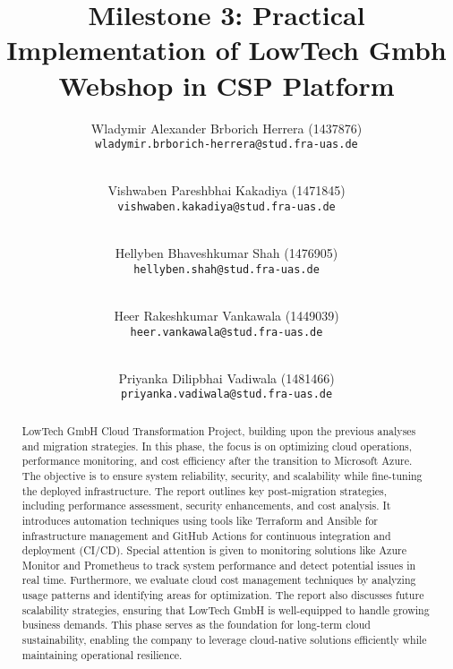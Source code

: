 \documentclass{llncs}
\newcommand{\what}{Milestone 3: Practical Implementation of LowTech Gmbh Webshop in CSP Platform}
\begin{document}
%
%
%
\mainmatter              %
%
\title{\what}
%
\author{
    Wladymir Alexander Brborich Herrera (1437876)\\
    \texttt{wladymir.brborich-herrera@stud.fra-uas.de}
    \and\\
    Vishwaben Pareshbhai Kakadiya (1471845)\\
    \texttt{vishwaben.kakadiya@stud.fra-uas.de}
    \and\\
    Hellyben Bhaveshkumar Shah (1476905)\\
    \texttt{hellyben.shah@stud.fra-uas.de}
    \and\\
    Heer Rakeshkumar Vankawala (1449039)
    \\
    \texttt{heer.vankawala@stud.fra-uas.de}
    \and\\
    Priyanka Dilipbhai Vadiwala (1481466)\\
    \texttt{priyanka.vadiwala@stud.fra-uas.de}
}
%

\maketitle              %


\begin{abstract}

    LowTech GmbH Cloud Transformation Project, building upon the previous analyses and migration strategies. In this phase,
the focus is on optimizing cloud operations, performance monitoring, and cost efficiency after the transition to Microsoft
Azure. The objective is to ensure system reliability, security, and scalability while fine-tuning the deployed infrastructure.
The report outlines key post-migration strategies, including performance assessment, security enhancements, and cost analysis.
It introduces automation techniques using tools like Terraform and Ansible for infrastructure management and GitHub Actions for
continuous integration and deployment (CI/CD). Special attention is given to monitoring solutions like Azure Monitor and Prometheus
to track system performance and detect potential issues in real time. Furthermore, we evaluate cloud cost management techniques by
analyzing usage patterns and identifying areas for optimization. The report also discusses future scalability strategies,
ensuring that LowTech GmbH is well-equipped to handle growing business demands. This phase serves as the foundation for long-term
cloud sustainability, enabling the company to leverage cloud-native solutions efficiently while maintaining operational resilience.

\end{abstract}
\end{document}
